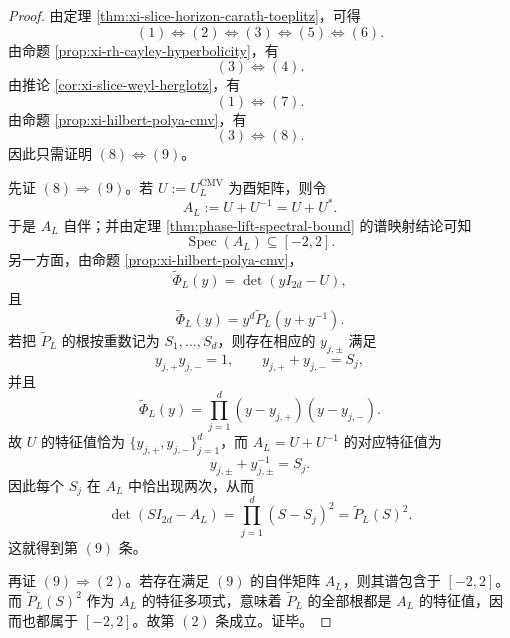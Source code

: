 \begin{proof}
由定理 \ref{thm:xi-slice-horizon-carath-toeplitz}，可得
\[
(1)\Longleftrightarrow(2)\Longleftrightarrow(3)\Longleftrightarrow(5)\Longleftrightarrow(6).
\]
由命题 \ref{prop:xi-rh-cayley-hyperbolicity}，有
\[
(3)\Longleftrightarrow(4).
\]
由推论 \ref{cor:xi-slice-weyl-herglotz}，有
\[
(1)\Longleftrightarrow(7).
\]
由命题 \ref{prop:xi-hilbert-polya-cmv}，有
\[
(3)\Longleftrightarrow(8).
\]
因此只需证明 \((8)\Longleftrightarrow(9)\)。

先证 \((8)\Rightarrow(9)\)。若 \(U:=U_L^{\mathrm{CMV}}\) 为酉矩阵，则令
\[
A_L:=U+U^{-1}=U+U^\ast.
\]
于是 \(A_L\) 自伴；并由定理 \ref{thm:phase-lift-spectral-bound} 的谱映射结论可知
\[
\operatorname{Spec}(A_L)\subseteq[-2,2].
\]
另一方面，由命题 \ref{prop:xi-hilbert-polya-cmv}，
\[
\widetilde\Phi_L(y)=\det(yI_{2d}-U),
\]
且
\[
\widetilde\Phi_L(y)=y^d\widetilde P_L(y+y^{-1}).
\]
若把 \(\widetilde P_L\) 的根按重数记为 \(S_1,\dots,S_d\)，则存在相应的 \(y_{j,\pm}\) 满足
\[
y_{j,+}y_{j,-}=1,
\qquad
y_{j,+}+y_{j,-}=S_j,
\]
并且
\[
\widetilde\Phi_L(y)=\prod_{j=1}^{d}(y-y_{j,+})(y-y_{j,-}).
\]
故 \(U\) 的特征值恰为 \(\{y_{j,+},y_{j,-}\}_{j=1}^{d}\)，而 \(A_L=U+U^{-1}\) 的对应特征值为
\[
y_{j,\pm}+y_{j,\pm}^{-1}=S_j.
\]
因此每个 \(S_j\) 在 \(A_L\) 中恰出现两次，从而
\[
\det(SI_{2d}-A_L)=\prod_{j=1}^{d}(S-S_j)^2=\widetilde P_L(S)^2.
\]
这就得到第 \((9)\) 条。

再证 \((9)\Rightarrow(2)\)。若存在满足 \((9)\) 的自伴矩阵 \(A_L\)，则其谱包含于 \([-2,2]\)。而 \(\widetilde P_L(S)^2\) 作为 \(A_L\) 的特征多项式，意味着 \(\widetilde P_L\) 的全部根都是 \(A_L\) 的特征值，因而也都属于 \([-2,2]\)。故第 \((2)\) 条成立。证毕。
\end{proof}


